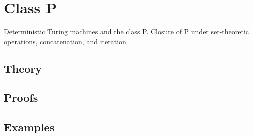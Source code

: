 
\section{Class P}
\label{sec:2.3a.10-class-p}

\begin{ticket}
Deterministic Turing machines and the class P. Closure of P under set-theoretic operations, concatenation, and iteration.
\end{ticket}

\subsection*{Theory}

\subsection*{Proofs}

\subsection*{Examples}
